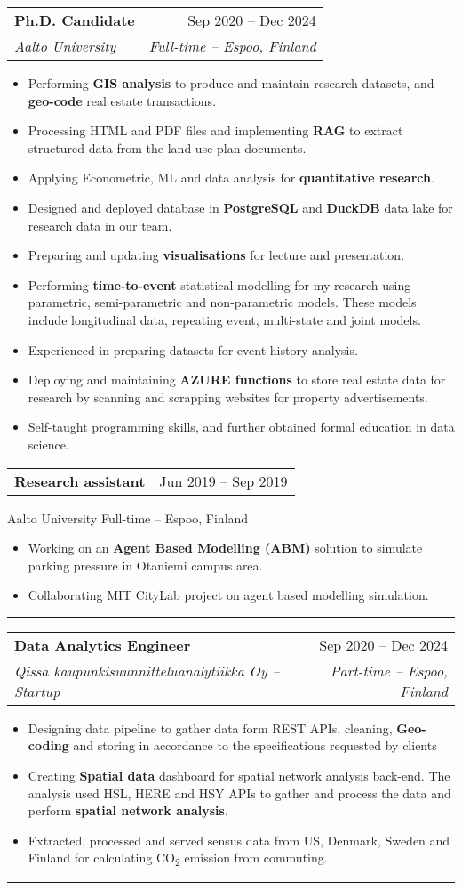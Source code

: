 \documentclass[a4paper,11pt]{article}
\makeatletter
\newcommand{\resumeItem}[1]{
	\item\small{#1}
}
\newcommand{\resumeItemListStart}{\begin{itemize}[rightmargin=0.11in]}
\newcommand{\resumeItemListEnd}{\end{itemize}}
\newcommand{\resumeQuadHeading}[4]{
	\item
	\begin{tabular*}{0.96\textwidth}[t]{l@{\extracolsep{\fill}}r}
		\textbf{#1} & #2 \\
		\textit{\small#3} & \textit{\small #4} \\
	\end{tabular*}
}
\newcommand{\resumeQuadHeadingChild}[2]{
	\item
	\begin{tabular*}{0.96\textwidth}[t]{l@{\extracolsep{\fill}}r}
		\textbf{\small#1} & {\small#2} \\
	\end{tabular*}
}
\makeatother
\begin{document}
	\resumeQuadHeading{Ph.D. Candidate}{Sep 2020 -- Dec 2024}
	{Aalto University}  {Full-time -- Espoo, Finland}
	\resumeItemListStart{}
	\resumeItem{Performing \textbf{GIS analysis} to produce and maintain research datasets, and \textbf{geo-code} real estate transactions.}
	\resumeItem{Processing HTML and PDF files and implementing \textbf{RAG} to extract structured data from the land use plan documents.}
	\resumeItem{Applying Econometric, ML and data analysis for \textbf{quantitative research}.}
	\resumeItem{Designed and deployed database in \textbf{PostgreSQL} and \textbf{DuckDB} data lake for research data in our team.}
	\resumeItem{Preparing and updating \textbf{visualisations} for lecture and presentation.}
	\resumeItem{Performing \textbf{time-to-event} statistical modelling for my research using parametric, semi-parametric and non-parametric models. These models include longitudinal data, repeating event, multi-state and joint models.}
	\resumeItem{Experienced in preparing datasets for event history analysis.}
	\resumeItem{Deploying and maintaining \textbf{AZURE functions} to store real estate data for research by scanning and scrapping websites for property advertisements.}
	\resumeItem{Self-taught programming skills, and further obtained formal education in data science.}
	\resumeItemListEnd{}
	
	\resumeQuadHeadingChild{Research assistant} {Jun 2019 -- Sep 2019}
	{Aalto University}  {Full-time -- Espoo, Finland}
	\resumeItemListStart{}
	\resumeItem{Working on an \textbf{Agent Based Modelling (ABM)} solution to simulate parking pressure in Otaniemi campus area.}
	\resumeItem{Collaborating MIT CityLab project on agent based modelling simulation.}
	\resumeItemListEnd{}
	\noindent\rule{0.5\linewidth}{0.4pt}


	\resumeQuadHeading{Data Analytics Engineer}{Sep 2020 -- Dec 2024}
	{Qissa kaupunkisuunnitteluanalytiikka Oy -- Startup}  {Part-time -- Espoo, Finland}
	\resumeItemListStart{}
	\resumeItem{Designing data pipeline to gather data form REST APIs, cleaning, \textbf{Geo-coding} and storing in accordance to the specifications requested by clients}
	\resumeItem{Creating \textbf{Spatial data} dashboard for spatial network analysis back-end. The analysis used HSL, HERE and HSY APIs to gather and process the data and perform \textbf{spatial network analysis}.}
	\resumeItem{Extracted, processed and served sensus data from US, Denmark, Sweden and Finland for calculating CO\textsubscript{2} emission from commuting.}
	\resumeItemListEnd{}
	\noindent\rule{0.5\linewidth}{0.4pt}
	
\end{document}
